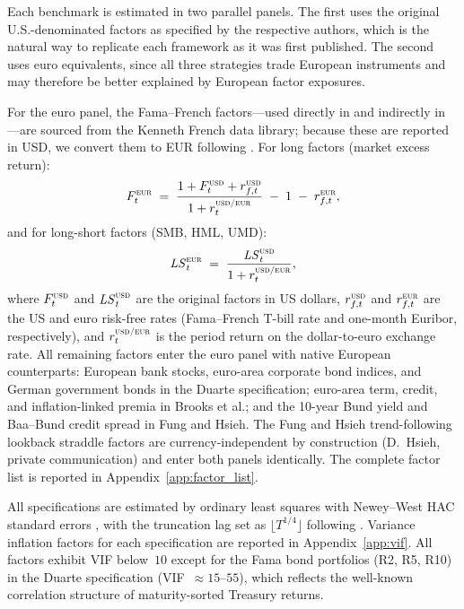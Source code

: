 Each benchmark is estimated in two parallel panels. The first uses the
original U.S.-denominated factors as specified by the respective authors,
which is the natural way to replicate each framework as it was first
published. The second uses euro equivalents, since all three strategies
trade European instruments and may therefore be better explained by
European factor exposures.

For the euro panel, the Fama--French factors---used directly in
\citet{duarte2007risk} and indirectly in
\citet{fung2004hedge}---are sourced from the Kenneth French data
library; because these are reported in USD, we convert them to EUR
following \citet{gluck2021currency}. For long factors (market excess
return):
\begin{equation}\label{eq:gluck_long}
  F_{t}^{\textsc{eur}}
  \;=\; \frac{1 + F_{t}^{\textsc{usd}} + r_{f,t}^{\textsc{usd}}}
             {1 + r_{t}^{\textsc{usd/eur}}}
        \;-\; 1 \;-\; r_{f,t}^{\textsc{eur}},
\end{equation}
and for long-short factors (SMB, HML, UMD):
\begin{equation}\label{eq:gluck_ls}
  \mathit{LS}_{t}^{\textsc{eur}}
  \;=\; \frac{\mathit{LS}_{t}^{\textsc{usd}}}
             {1 + r_{t}^{\textsc{usd/eur}}},
\end{equation}
where $F_{t}^{\textsc{usd}}$ and $\mathit{LS}_{t}^{\textsc{usd}}$ are
the original factors in US dollars, $r_{f,t}^{\textsc{usd}}$ and
$r_{f,t}^{\textsc{eur}}$ are the US and euro risk-free rates
(Fama--French T-bill rate and one-month Euribor, respectively), and
$r_{t}^{\textsc{usd/eur}}$ is the period return on the dollar-to-euro
exchange rate.
All remaining factors enter the euro panel with native European
counterparts: European bank stocks, euro-area corporate bond indices,
and German government bonds in the Duarte specification; euro-area
term, credit, and inflation-linked premia in Brooks et al.; and the
10-year Bund yield and Baa--Bund credit spread in Fung and Hsieh.
The Fung and Hsieh trend-following lookback straddle factors are
currency-independent by construction (D.~Hsieh, private
communication) and enter both panels identically. The complete factor
list is reported in Appendix~\ref{app:factor_list}.

All specifications are estimated by ordinary least squares with
Newey--West HAC standard errors \citep{newey1987simple}, with the
truncation lag set as $\lfloor T^{1/4} \rfloor$ following
\citet{newey1994automatic}. Variance inflation factors for each specification are reported in
Appendix~\ref{app:vif}. All factors exhibit VIF below~$10$ except
for the Fama bond portfolios (R2, R5, R10) in the Duarte
specification (VIF~$\approx 15$--$55$), which reflects the
well-known correlation structure of maturity-sorted Treasury
returns.


